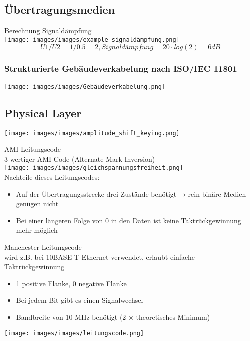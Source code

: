 \subsection*{Übertragungsmedien}

\begin{example2}{Berechnung Signaldämpfung}\\
    \texttt{[image: images/images/example\_signaldämpfung.png]}
    $$U1/U2 = 1/0.5 = 2, Signaldämpfung = 20 \cdot log(2) = 6dB$$
\end{example2}

\subsubsection{Strukturierte Gebäudeverkabelung nach ISO/IEC 11801}
        \centering
        \texttt{[image: images/images/Gebäudeverkabelung.png]}

\subsection*{Physical Layer}

\begin{example}
    \texttt{[image: images/images/amplitude\_shift\_keying.png]}
\end{example}

\begin{concept}{AMI Leitungscode}\\
    3-wertiger AMI-Code (Alternate Mark Inversion)\\
    \texttt{[image: images/images/gleichspannungsfreiheit.png]}\\
    Nachteile dieses Leitungscodes:
    \begin{itemize}
        \item Auf der Übertragungsstrecke drei Zustände benötigt → rein binäre Medien genügen nicht
        \item Bei einer längeren Folge von 0 in den Daten ist keine Taktrückgewinnung mehr möglich
    \end{itemize}
\end{concept}

\begin{concept}{Manchester Leitungscode}\\
    wird z.B. bei 10BASE-T Ethernet verwendet, erlaubt einfache Taktrückgewinnung
    \begin{itemize}
        \item 1 positive Flanke, 0 negative Flanke
        \item Bei jedem Bit gibt es einen Signalwechsel
        \item Bandbreite von 10 MHz benötigt (2 $\times$ theoretisches Minimum)
    \end{itemize}
    \texttt{[image: images/images/leitungscode.png]}
\end{concept}

